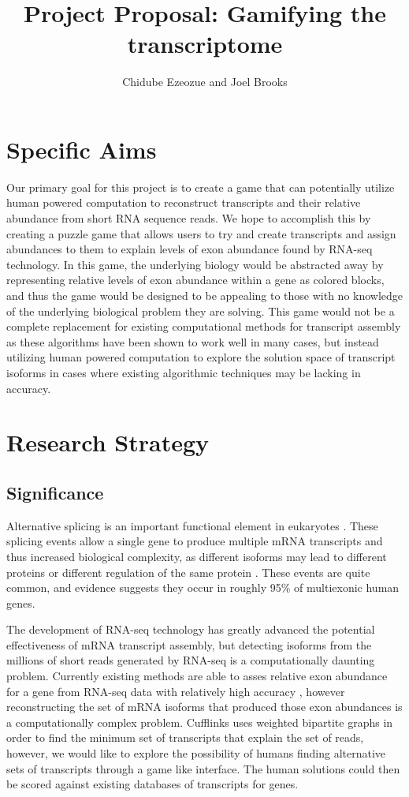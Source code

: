 \documentclass[12pt]{article}
\title{Project Proposal: Gamifying the transcriptome}
\author{Chidube Ezeozue and Joel Brooks}
\begin{document}

\renewcommand\refname{Bibliography}
\maketitle

\section*{Specific Aims}
Our primary goal for this project is to create a game that can potentially utilize human powered computation to reconstruct transcripts and their relative abundance from short RNA sequence reads. We hope to accomplish this by creating a puzzle game that allows users to try and create transcripts and assign abundances to them to explain levels of exon abundance found by RNA-seq technology. In this game, the underlying biology would be abstracted away by representing relative levels of exon abundance within a gene as colored blocks, and thus the game would be designed to be appealing to those with no knowledge of the underlying biological problem they are solving. This game would not be a complete replacement for existing computational methods for transcript assembly as these algorithms have been shown to work well in many cases, but instead utilizing human powered computation to explore the solution space of transcript isoforms in cases where existing algorithmic techniques may be lacking in accuracy.

\section*{Research Strategy}

\subsection*{Significance}
Alternative splicing is an important functional element in eukaryotes \citep{pan2008deep}. These splicing events allow a single gene to produce multiple mRNA transcripts and thus increased biological complexity, as different isoforms may lead to different proteins or different regulation of the same protein \citep{trapnell2010transcript}. These events are quite common, and evidence suggests they occur in roughly 95\% of multiexonic human genes.

The development of RNA-seq technology has greatly advanced the potential effectiveness of mRNA transcript assembly, but detecting isoforms from the millions of short reads generated by RNA-seq is a computationally daunting problem. Currently existing methods are able to asses relative exon abundance for a gene from RNA-seq data with relatively high accuracy \citep{trapnell2009tophat}, however reconstructing the set of mRNA isoforms that produced those exon abundances is a computationally complex problem. Cufflinks uses weighted bipartite graphs in order to find the minimum set of transcripts that explain the set of reads, however, we would like to explore the possibility of humans finding alternative sets of transcripts through a game like interface. The human solutions could then be scored against existing databases of transcripts for genes.
\end{document}
